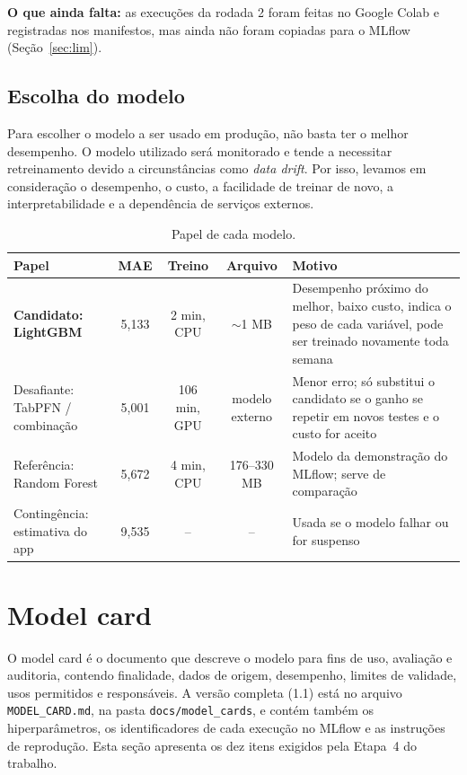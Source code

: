 \documentclass[11pt,a4paper]{article}
\begin{document}
\noindent\textbf{O que ainda falta:} as execuções da rodada 2 foram feitas no Google Colab e
registradas nos manifestos, mas ainda não foram copiadas para o MLflow (Seção~\ref{sec:lim}).

\subsection{Escolha do modelo}

Para escolher o modelo a ser usado em produção, não basta ter o melhor desempenho.
O modelo utilizado será monitorado e tende a necessitar retreinamento devido a 
circunstâncias como \emph{data drift}. Por isso, levamos em consideração o desempenho, o custo, a facilidade
de treinar de novo, a interpretabilidade e a dependência de serviços externos.

\begin{table}[H]
\centering\small
\begin{tabularx}{\linewidth}{l c c c L}
\toprule
Papel & MAE & Treino & Arquivo & Motivo \\
\midrule
\textbf{Candidato: LightGBM} & 5,133 & 2 min, CPU & $\sim$1 MB & Desempenho próximo do melhor, baixo custo, indica o peso de cada variável, pode ser treinado novamente toda semana \\
Desafiante: TabPFN / combinação & 5,001 & 106 min, GPU & modelo externo & Menor erro; só substitui o candidato se o ganho se repetir em novos testes e o custo for aceito \\
Referência: Random Forest & 5,672 & 4 min, CPU & 176--330 MB & Modelo da demonstração do MLflow; serve de comparação \\
Contingência: estimativa do app & 9,535 & -- & -- & Usada se o modelo falhar ou for suspenso \\
\bottomrule
\end{tabularx}
\caption{Papel de cada modelo.}
\end{table}

\section{Model card}
\label{sec:card}

O model card é o documento que descreve o modelo para fins de uso, avaliação e auditoria,
contendo finalidade, dados de origem, desempenho, limites de validade, usos permitidos e
responsáveis. A versão completa (1.1) está no arquivo \texttt{MODEL\_CARD.md}, na pasta
\texttt{docs/model\_cards}, e contém também os hiperparâmetros, os identificadores de cada
execução no MLflow e as instruções de reprodução. Esta seção apresenta os dez itens exigidos
pela Etapa~4 do trabalho.
\end{document}
